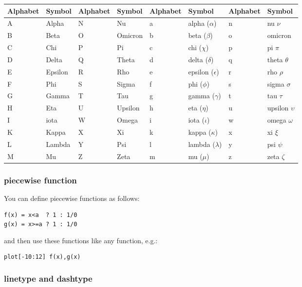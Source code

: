 \begin{tabular}{ll|ll|ll|ll}
\hline
Alphabet&Symbol  &Alphabet 	&Symbol   &Alphabet 	&Symbol  &Alphabet 	&Symbol  \\
\hline
\hline
A 	&Alpha 	 &N 		&Nu 	  &a 		&alpha ($\alpha$)     &n 		&nu  $\nu$\\
B 	&Beta 	 &O 		&Omicron  &b 		&beta  ($\beta$)      &o 		&omicron  \\
C 	&Chi 	 &P 		&Pi 	  &c 		&chi   ($\chi$)	      &p 		&pi  $\pi$\\
D 	&Delta 	 &Q 		&Theta 	  &d 		&delta  ($\delta$)    &q 		&theta $\theta$ \\
E 	&Epsilon &R 		&Rho 	  &e 		&epsilon ($\epsilon$) &r 		&rho  $\rho$\\
F 	&Phi 	 &S 		&Sigma 	  &f 		&phi 	($\phi$)      &s 		&sigma  $\sigma$\\
G 	&Gamma 	 &T 		&Tau 	  &g 		&gamma 	($\gamma$)    &t 		&tau  $\tau$\\
H 	&Eta 	 &U 		&Upsilon  &h 		&eta 	($\eta$)      &u 		&upsilon  $\upsilon$\\
I 	&iota 	 &W 		&Omega 	  &i 		&iota 	($\iota$)     &w 		&omega  $\omega$\\
K 	&Kappa 	 &X 		&Xi 	  &k 		&kappa 	($\kappa$)    &x 		&xi  $\xi$\\
L 	&Lambda  &Y 		&Psi 	  &l 		&lambda  ($\lambda$)  &y 		&psi  $\psi$\\
M 	&Mu 	 &Z 		&Zeta 	  &m 		&mu 	($\mu$)       &z 		&zeta $\zeta$\\
\hline
\end{tabular}


\subsubsection*{piecewise function}

You can define piecewise functions as follows:
\begin{verbatim}
f(x) = x<a  ? 1 : 1/0
g(x) = x>=a ? 1 : 1/0 
\end{verbatim}
and then use these functions like any function, e.g.:
\begin{verbatim}
plot[-10:12] f(x),g(x)
\end{verbatim}



\subsubsection*{linetype and dashtype}

